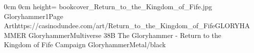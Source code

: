 \documentclass[letterpaper,openany,twoside,twocolumn]{book}
\begin{document}
	\DungeonSheetGeometry

		{0cm}%
		{0cm}%
		{height=\paperheight}%
		{bookcover_Return_to_the_Kingdom_of_Fife.jpg}%
		{%
			{Gloryhammer1}{Page \thepage}{Art}{https://casinodundee.com/art/}{Return_to_the_Kingdom_of_Fife}{GLORYHAMMER}%
		}%
		{{\darkcrystalfont}{Gloryhammer}{\digitalfont}{Multiverse 38B}}%
		{{\digitalfont}{The Gloryhammer - Return to the Kingdom of Fife Campaign}}%
		{GloryhammerMetal/black}%
	
	\clearpage
	\tableofcontents
	
	\DndSetThemeColor[PhbTan]
\end{document}
